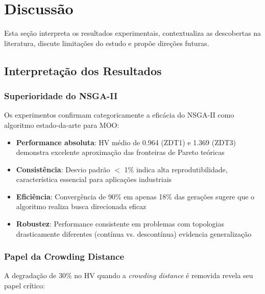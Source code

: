 
\section{Discussão}

Esta seção interpreta os resultados experimentais, contextualiza as descobertas na literatura, discute limitações do estudo e propõe direções futuras.

\subsection{Interpretação dos Resultados}

\subsubsection{Superioridade do NSGA-II}

Os experimentos confirmam categoricamente a eficácia do NSGA-II como algoritmo estado-da-arte para MOO:

\begin{itemize}
    \item \textbf{Performance absoluta}: HV médio de 0.964 (ZDT1) e 1.369 (ZDT3) demonstra excelente aproximação das fronteiras de Pareto teóricas
    
    \item \textbf{Consistência}: Desvio padrão $<$ 1\% indica alta reprodutibilidade, característica essencial para aplicações industriais
    
    \item \textbf{Eficiência}: Convergência de 90\% em apenas 18\% das gerações sugere que o algoritmo realiza busca direcionada eficaz
    
    \item \textbf{Robustez}: Performance consistente em problemas com topologias drasticamente diferentes (contínua vs. descontínua) evidencia generalização
\end{itemize}

\subsubsection{Papel da Crowding Distance}

A degradação de 30\% no HV quando a \textit{crowding distance} é removida revela seu papel crítico:

